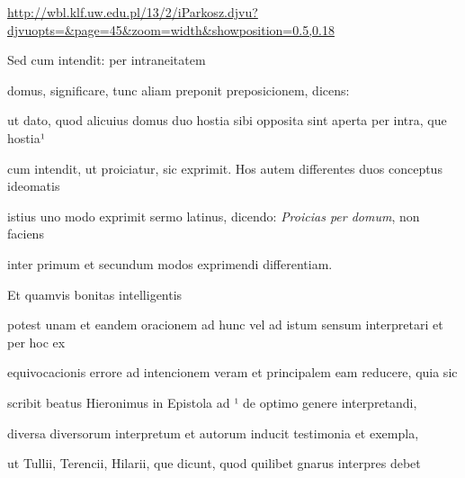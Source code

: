 
\newParkoszpage

\url{http://wbl.klf.uw.edu.pl/13/2/iParkosz.djvu?djvuopts=&page=45&zoom=width&showposition=0.5,0.18}

\fullpreviouslines


{
\color{blue}

Sed cum intendit: per intraneitatem

domus, significare, tunc aliam preponit preposicionem, dicens: 

}



\fulllines{}
ut dato, quod alicuius domus duo hostia sibi opposita sint aperta per intra, que hostia¹

cum intendit, ut proiciatur, sic exprimit. Hos autem differentes duos conceptus ideomatis

istius uno modo exprimit sermo latinus, dicendo: \textit{Proicias per domum}, non faciens

\splitlines{}

inter primum et secundum modos exprimendi differentiam.

\indentK Et quamvis bonitas intelligentis 

\fulllines{}

potest unam et eandem oracionem ad hunc vel ad istum sensum interpretari et per hoc ex

equivocacionis errore ad intencionem veram et principalem eam reducere, quia sic

scribit beatus Hieronimus in Epistola ad ¹ de optimo genere interpretandi,

diversa diversorum interpretum et autorum inducit testimonia et exempla,

ut Tullii, Terencii, Hilarii, que dicunt, quod quilibet gnarus interpres debet


